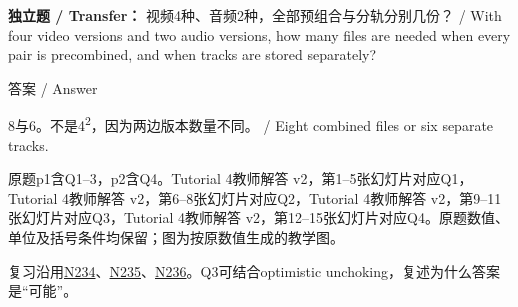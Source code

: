 \textbf{独立题 / Transfer：} 视频4种、音频2种，全部预组合与分轨分别几份？ / With four video versions and two audio versions, how many files are needed when every pair is precombined, and when tracks are stored separately?



\begin{StudySolution}{答案 / Answer}


8与6。不是4\textsuperscript{2}，因为两边版本数量不同。 / Eight combined files or six separate tracks.


\end{StudySolution}





原题p1含Q1–3，p2含Q4。Tutorial 4教师解答 v2，第1–5张幻灯片对应Q1，Tutorial 4教师解答 v2，第6–8张幻灯片对应Q2，Tutorial 4教师解答 v2，第9–11张幻灯片对应Q3，Tutorial 4教师解答 v2，第12–15张幻灯片对应Q4。原题数值、单位及括号条件均保留；图为按原数值生成的教学图。


复习沿用\href{https://crazyshout.github.io/micro-course/cards.html\#CS5222-N234}{N234}、\href{https://crazyshout.github.io/micro-course/cards.html\#CS5222-N235}{N235}、\href{https://crazyshout.github.io/micro-course/cards.html\#CS5222-N236}{N236}。Q3可结合optimistic unchoking，复述为什么答案是“可能”。
